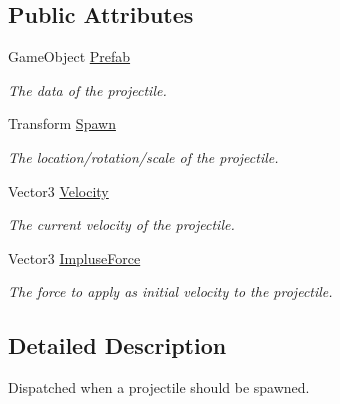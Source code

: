 \subsection*{Public Attributes}
\begin{DoxyCompactItemize}
\item 
Game\-Object \hyperlink{class_skyrates_1_1_game_1_1_event_1_1_event_spawn_entity_projectile_a721e20a22540f3731523cf87a76661f0}{Prefab}
\begin{DoxyCompactList}\small\item\em The data of the projectile. \end{DoxyCompactList}\item 
Transform \hyperlink{class_skyrates_1_1_game_1_1_event_1_1_event_spawn_entity_projectile_acc1064c2d3d99193935db2d8082c692e}{Spawn}
\begin{DoxyCompactList}\small\item\em The location/rotation/scale of the projectile. \end{DoxyCompactList}\item 
Vector3 \hyperlink{class_skyrates_1_1_game_1_1_event_1_1_event_spawn_entity_projectile_a11c314dd0b38e9836c5f363b0e34c31f}{Velocity}
\begin{DoxyCompactList}\small\item\em The current velocity of the projectile. \end{DoxyCompactList}\item 
Vector3 \hyperlink{class_skyrates_1_1_game_1_1_event_1_1_event_spawn_entity_projectile_ab5cdafc2c74cc74101cf8a8ce825ccbd}{Impluse\-Force}
\begin{DoxyCompactList}\small\item\em The force to apply as initial velocity to the projectile. \end{DoxyCompactList}\end{DoxyCompactItemize}


\subsection{Detailed Description}
Dispatched when a projectile should be spawned. 



